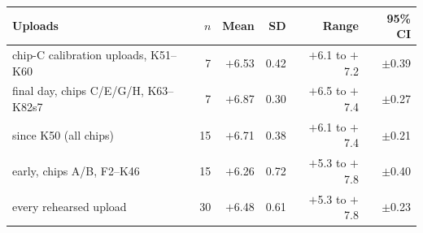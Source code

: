 {\small
\begin{tabular}{@{}p{5.6cm}rrrrr@{}}
\toprule
Uploads & $n$ & Mean & SD & Range & 95\% CI \\
\midrule
chip-C calibration uploads, K51--K60 & 7 & \ensuremath{+}6.53 & 0.42 & \ensuremath{+}6.1 to \ensuremath{+}7.2 & $\pm$0.39 \\
final day, chips C/E/G/H, K63--K82s7 & 7 & \ensuremath{+}6.87 & 0.30 & \ensuremath{+}6.5 to \ensuremath{+}7.4 & $\pm$0.27 \\
since K50 (all chips) & 15 & \ensuremath{+}6.71 & 0.38 & \ensuremath{+}6.1 to \ensuremath{+}7.4 & $\pm$0.21 \\
early, chips A/B, F2--K46 & 15 & \ensuremath{+}6.26 & 0.72 & \ensuremath{+}5.3 to \ensuremath{+}7.8 & $\pm$0.40 \\
every rehearsed upload & 30 & \ensuremath{+}6.48 & 0.61 & \ensuremath{+}5.3 to \ensuremath{+}7.8 & $\pm$0.23 \\
\bottomrule
\end{tabular}
}
